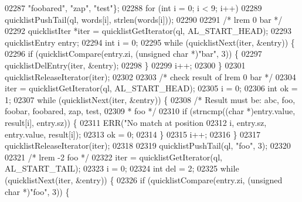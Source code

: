 \begin{DoxyCode}
{{{{{{{{{{{{{{{{{{{{{{{{{{{{{{{{{{{{{{{{{{{{{{{{{{{{{{{{{{{{{{{{{{{{{{{{{{{{{{{{{{{02287                                    \textcolor{stringliteral}{"foobared"}, \textcolor{stringliteral}{"zap"}, \textcolor{stringliteral}{"test"}\};
02288                 \textcolor{keywordflow}{for} (\textcolor{keywordtype}{int} i = 0; i < 9; i++)
02289                     quicklistPushTail(ql, words[i], strlen(words[i]));
02290 
02291                 \textcolor{comment}{/* lrem 0 bar */}
02292                 quicklistIter *iter = quicklistGetIterator(ql, AL\_START\_HEAD);
02293                 quicklistEntry entry;
02294                 \textcolor{keywordtype}{int} i = 0;
02295                 \textcolor{keywordflow}{while} (quicklistNext(iter, &entry)) \{
02296                     \textcolor{keywordflow}{if} (quicklistCompare(entry.zi, (\textcolor{keywordtype}{unsigned} \textcolor{keywordtype}{char} *)\textcolor{stringliteral}{"bar"}, 3)) \{
02297                         quicklistDelEntry(iter, &entry);
02298                     \}
02299                     i++;
02300                 \}
02301                 quicklistReleaseIterator(iter);
02302 
02303                 \textcolor{comment}{/* check result of lrem 0 bar */}
02304                 iter = quicklistGetIterator(ql, AL\_START\_HEAD);
02305                 i = 0;
02306                 \textcolor{keywordtype}{int} ok = 1;
02307                 \textcolor{keywordflow}{while} (quicklistNext(iter, &entry)) \{
02308                     \textcolor{comment}{/* Result must be: abc, foo, foobar, foobared, zap, test,}
02309 \textcolor{comment}{                     * foo */}
02310                     \textcolor{keywordflow}{if} (strncmp((\textcolor{keywordtype}{char} *)entry.value, result[i], entry.sz)) \{
02311                         ERR(\textcolor{stringliteral}{"No match at position %
02312                             i, entry.sz, entry.value, result[i]);
02313                         ok = 0;
02314                     \}
02315                     i++;
02316                 \}
02317                 quicklistReleaseIterator(iter);
02318 
02319                 quicklistPushTail(ql, \textcolor{stringliteral}{"foo"}, 3);
02320 
02321                 \textcolor{comment}{/* lrem -2 foo */}
02322                 iter = quicklistGetIterator(ql, AL\_START\_TAIL);
02323                 i = 0;
02324                 \textcolor{keywordtype}{int} del = 2;
02325                 \textcolor{keywordflow}{while} (quicklistNext(iter, &entry)) \{
02326                     \textcolor{keywordflow}{if} (quicklistCompare(entry.zi, (\textcolor{keywordtype}{unsigned} \textcolor{keywordtype}{char} *)\textcolor{stringliteral}{"foo"}, 3)) \{
}}}}}}}}}}}}}}}}}}}}}}}}}}}}}}}}}}}}}}}}}}}}}}}}}}}}}}}}}}}}}}}}}}}}}}}}}}}}}}}}}}}}
\end{DoxyCode}
